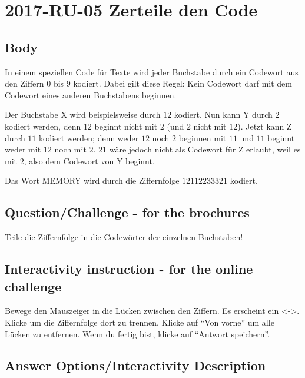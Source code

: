 \documentclass[a4paper,11pt]{report}
\newcommand{\BrochureInlineCode}[1]{{\ttfamily #1}}
\begin{document}
\section*{\centering{} 2017-RU-05 Zerteile den Code}


\subsection*{Body}

In einem speziellen Code für Texte wird jeder Buchstabe durch ein Codewort aus den Ziffern $0$ bis $9$ kodiert.
Dabei gilt diese Regel: Kein Codewort darf mit dem Codewort eines anderen Buchstabens beginnen.

Der Buchstabe \BrochureInlineCode{X} wird beispielsweise durch $12$ kodiert. Nun kann \BrochureInlineCode{Y} durch $2$ kodiert werden, denn $12$ beginnt nicht mit $2$ (und $2$ nicht mit $12$). Jetzt kann \BrochureInlineCode{Z} durch $11$ kodiert werden; denn weder $12$ noch $2$ beginnen mit $11$ und $11$ beginnt weder mit $12$ noch mit $2$. $21$ wäre jedoch nicht als Codewort für \BrochureInlineCode{Z} erlaubt, weil es mit $2$, also dem Codewort von \BrochureInlineCode{Y} beginnt.

Das Wort \BrochureInlineCode{MEMORY} wird durch die Ziffernfolge $12112233321$ kodiert.

{\em


\subsection*{Question/Challenge - for the brochures}

Teile die Ziffernfolge in die Codewörter der einzelnen Buchstaben!

}


\subsection*{Interactivity instruction - for the online challenge}

Bewege den Mauszeiger in die Lücken zwischen den Ziffern. Es erscheint ein <->. Klicke um die Ziffernfolge dort zu trennen. Klicke auf \enquote{Von vorne} um alle Lücken zu entfernen. Wenn du fertig bist, klicke auf \enquote{Antwort speichern}.

\begingroup
\renewcommand{\arraystretch}{1.5}
\subsection*{Answer Options/Interactivity Description}
\end{document}
